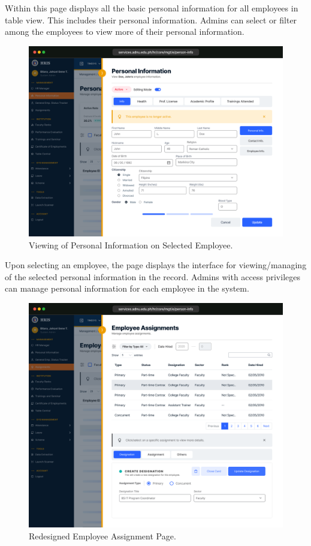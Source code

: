     Within this page displays all the basic personal information for all employees in table view. This includes their personal information. Admins can select or filter among the employees to view more of their personal information.

    \begin{figure}[H]
        \centering
        \includegraphics[width=1\linewidth]{figures/app/pi-info.png}
        \caption{Viewing of Personal Information on Selected Employee.}
        \label{fig:app-pi-info}
    \end{figure}

    Upon selecting an employee, the page displays the interface for viewing/managing of the selected personal information in the record. Admins with access privileges can manage personal information for each employee  in the system.

    \begin{figure}[H]
        \centering
        \includegraphics[width=1\linewidth]{figures/app/assignment.png}
        \caption{Redesigned Employee Assignment Page.}
        \label{fig:app-assignment}
    \end{figure}

